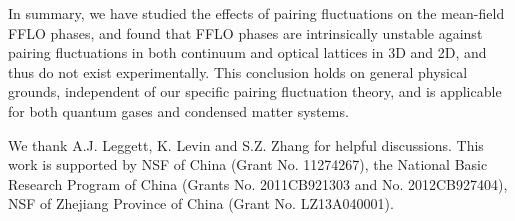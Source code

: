 \documentclass[aps,twocolumn,prl,tightenlines,floatfix]{revtex4-1}
\begin{document}
In summary, we have studied the effects of pairing fluctuations on the
mean-field FFLO phases, and found that FFLO phases are intrinsically
unstable against pairing fluctuations in both continuum and optical
lattices in 3D and 2D, and thus do not exist experimentally. This
conclusion holds on general physical grounds, independent of our
specific pairing fluctuation theory, and is applicable for both
quantum gases and condensed matter systems.

We thank A.J. Leggett, K. Levin and S.Z. Zhang for helpful
discussions. This work is supported by NSF of China (Grant
No. 11274267), the National Basic Research Program of China (Grants
No. 2011CB921303 and No. 2012CB927404), NSF of Zhejiang Province of
China (Grant No.  LZ13A040001).


\end{document}
